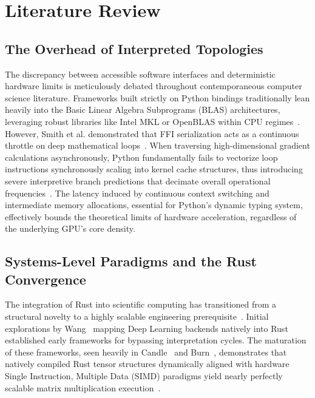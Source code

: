 \documentclass[conference]{IEEEtran}
\begin{document}
\section{Literature Review}
\label{sec:literature}
\subsection{The Overhead of Interpreted Topologies}
The discrepancy between accessible software interfaces and deterministic hardware limits is meticulously debated throughout contemporaneous computer science literature. Frameworks built strictly on Python bindings traditionally lean heavily into the Basic Linear Algebra Subprograms (BLAS) architectures, leveraging robust libraries like Intel MKL or OpenBLAS within CPU regimes~\cite{ref5,ref2}. However, Smith et al. demonstrated that FFI serialization acts as a continuous throttle on deep mathematical loops~\cite{ref6}. When traversing high-dimensional gradient calculations asynchronously, Python fundamentally fails to vectorize loop instructions synchronously scaling into kernel cache structures, thus introducing severe interpretive branch predictions that decimate overall operational frequencies~\cite{ref7}. The latency induced by continuous context switching and intermediate memory allocations, essential for Python's dynamic typing system, effectively bounds the theoretical limits of hardware acceleration, regardless of the underlying GPU's core density.

\subsection{Systems-Level Paradigms and the Rust Convergence}
The integration of Rust into scientific computing has transitioned from a structural novelty to a highly scalable engineering prerequisite~\cite{ref20}. Initial explorations by Wang~\cite{ref14} mapping Deep Learning backends natively into Rust established early frameworks for bypassing interpretation cycles. The maturation of these frameworks, seen heavily in Candle~\cite{ref15} and Burn~\cite{ref16}, demonstrates that natively compiled Rust tensor structures dynamically aligned with hardware Single Instruction, Multiple Data (SIMD) paradigms yield nearly perfectly scalable matrix multiplication execution~\cite{ref17,ref18}. 
\end{document}
